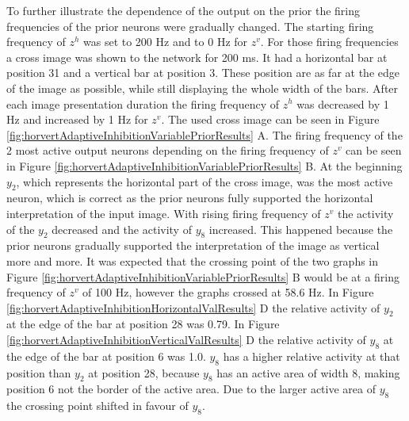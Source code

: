 To further illustrate the dependence of the output on the prior the firing frequencies of the prior neurons were gradually changed. The starting firing frequency of $z^h$ was set to 200 Hz and to 0 Hz for $z^v$. For those firing frequencies a cross image was shown to the network for 200 ms. It had a horizontal bar at position 31 and a vertical bar at position 3. These position are as far at the edge of the image as possible, while still displaying the whole width of the bars. After each image presentation duration the firing frequency of $z^h$ was decreased by 1 Hz and increased by 1 Hz for $z^v$. The used cross image can be seen in Figure \ref{fig:horvertAdaptiveInhibitionVariablePriorResults} A. The firing frequency of the 2 most active output neurons depending on the firing frequency of $z^v$ can be seen in Figure \ref{fig:horvertAdaptiveInhibitionVariablePriorResults} B. At the beginning $y_2$, which represents the horizontal part of the cross image, was the most active neuron, which is correct as the prior neurons fully supported the horizontal interpretation of the input image. With rising firing frequency of $z^v$ the activity of the $y_2$ decreased and the activity of $y_8$ increased. This happened because the prior neurons gradually supported the interpretation of the image as vertical more and more. It was expected that the crossing point of the two graphs in Figure \ref{fig:horvertAdaptiveInhibitionVariablePriorResults} B would be at a firing frequency of $z^v$ of 100 Hz, however the graphs crossed at 58.6 Hz. In Figure \ref{fig:horvertAdaptiveInhibitionHorizontalValResults} D the relative activity of $y_2$ at the edge of the bar at position 28 was 0.79. In Figure \ref{fig:horvertAdaptiveInhibitionVerticalValResults} D the relative activity of $y_8$ at the edge of the bar at position 6 was 1.0. $y_8$ has a higher relative activity at that position than $y_2$ at position 28, because $y_8$ has an  active area of width 8, making position 6 not the border of the active area. Due to the larger active area of $y_8$ the crossing point shifted in favour of $y_8$.

